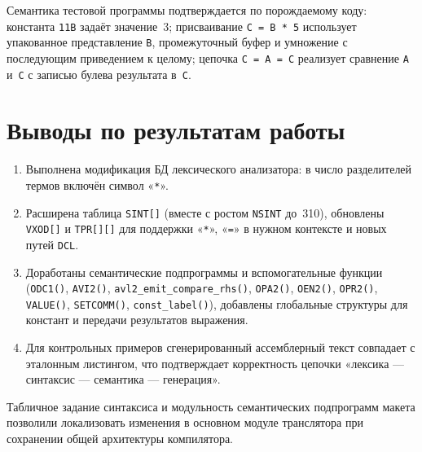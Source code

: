 \documentclass[a4paper,14pt]{extarticle}
\begin{document}
Семантика тестовой программы подтверждается по порождаемому коду: константа
\texttt{11B} задаёт значение~3; присваивание \texttt{C = B * 5} использует
упакованное представление \texttt{B}, промежуточный буфер и умножение с
последующим приведением к целому; цепочка \texttt{C = A = C} реализует сравнение
\texttt{A} и~\texttt{C} с записью булева результата в~\texttt{C}.

\section{Выводы по результатам работы}

\begin{enumerate}
  \item Выполнена модификация БД лексического анализатора: в число разделителей
        термов включён символ «\texttt{*}».

  \item Расширена таблица \texttt{SINT[]} (вместе с ростом \texttt{NSINT} до~310),
        обновлены \texttt{VXOD[]} и \texttt{TPR[][]} для поддержки «\texttt{*}»,
        «\texttt{=}» в нужном контексте и новых путей \texttt{DCL}.

  \item Доработаны семантические подпрограммы и вспомогательные функции
        (\texttt{ODC1()}, \texttt{AVI2()}, \texttt{avl2\_emit\_compare\_rhs()},
        \texttt{OPA2()}, \texttt{OEN2()}, \texttt{OPR2()}, \texttt{VALUE()},
        \texttt{SETCOMM()}, \texttt{const\_label()}), добавлены глобальные
        структуры для констант и передачи результатов выражения.

  \item Для контрольных примеров сгенерированный ассемблерный текст совпадает с
        эталонным листингом, что подтверждает корректность цепочки «лексика —
        синтаксис — семантика — генерация».
\end{enumerate}

Табличное задание синтаксиса и модульность семантических подпрограмм макета
позволили локализовать изменения в основном модуле транслятора при сохранении
общей архитектуры компилятора.
\end{document}
